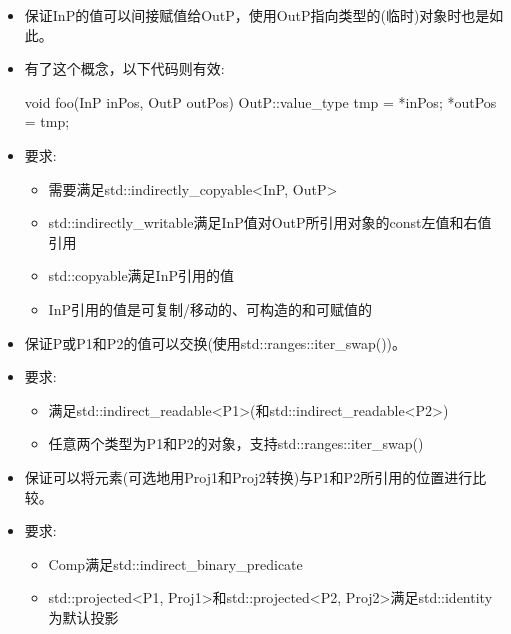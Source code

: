 \begin{itemize}
\item
保证InP的值可以间接赋值给OutP，使用OutP指向类型的(临时)对象时也是如此。

\item
有了这个概念，以下代码则有效:

\begin{cpp}
void foo(InP inPos, OutP outPos) {
	OutP::value_type tmp = *inPos;
	*outPos = tmp;
}
\end{cpp}

\item
要求:
\begin{itemize}
\item
需要满足std::indirectly\_copyable<InP, OutP>

\item
std::indirectly\_writable满足InP值对OutP所引用对象的const左值和右值引用

\item
std::copyable满足InP引用的值

\item
InP引用的值是可复制/移动的、可构造的和可赋值的
\end{itemize}
\end{itemize}


\begin{itemize}
\item
保证P或P1和P2的值可以交换(使用std::ranges::iter\_swap())。

\item
要求:
\begin{itemize}
\item
满足std::indirect\_readable<P1>(和std::indirect\_readable<P2>)

\item
任意两个类型为P1和P2的对象，支持std::ranges::iter\_swap()
\end{itemize}
\end{itemize}


\begin{itemize}
\item
保证可以将元素(可选地用Proj1和Proj2转换)与P1和P2所引用的位置进行比较。

\item
要求:
\begin{itemize}
\item
Comp满足std::indirect\_binary\_predicate

\item
std::projected<P1, Proj1>和std::projected<P2, Proj2>满足std::identity为默认投影
\end{itemize}
\end{itemize}

